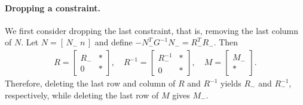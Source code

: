 \documentclass{article}
\begin{document}
	\paragraph{Dropping a constraint.}
	We first consider dropping the last constraint, that is, removing the last column of $N$.  
	Let $N = [\,N_{-}\; n\,]$ and define $-N_{-}^{T}G^{-1}N_{-} = R_{-}^{T}R_{-}$.  
	Then
	\begin{align*}
		R = 
		\begin{bmatrix}
			R_{-} & \ast\\
			0 & \ast
		\end{bmatrix}, \quad
		R^{-1} = 
		\begin{bmatrix}
			R_{-}^{-1} & \ast\\
			0 & \ast
		\end{bmatrix}, \quad
		M = 
		\begin{bmatrix}
			M_{-}\\
			\ast
		\end{bmatrix}.
	\end{align*}
	Therefore, deleting the last row and column of $R$ and $R^{-1}$ yields $R_{-}$ and $R_{-}^{-1}$, respectively, while deleting the last row of $M$ gives $M_{-}$.
	
\end{document}

